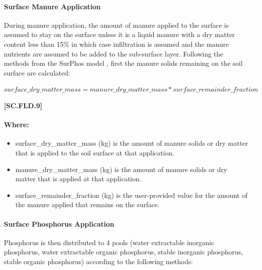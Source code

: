 \paragraph{Surface Manure Application}
\vspace{-0.25cm}

During manure application, the amount of manure applied to the surface is assumed to stay on the surface unless it is a liquid manure with a dry matter content less than 15\% in which case infiltration is assumed and the manure nutrients are assumed to be added to the sub-surface layer. Following the methods from the SurPhos model \parencite{vadas2007}, first the manure solids remaining on the soil surface are calculated:
            \vspace{0.5cm} 
    
    \begin{center}
        \(surface\_dry\_matter\_mass=manure\_dry\_matter\_mass * surface\_remainder\_fraction\)
    \end{center}
        \vspace{0.5cm} 
    
            {\raggedleft \textbf{[SC.FLD.9]}\par}
            \vspace{0.5cm} 
            
\paragraph{Where:}
\begin{itemize}
    \item surface\_dry\_matter\_mass (kg) is the amount of manure solids or dry matter that is applied to the soil surface at that application. 
    \item manure\_dry\_matter\_mass (kg) is the amount of manure solids or dry matter that is applied at that application. 
    \item surface\_remainder\_fraction (kg) is the user-provided value for the amount of the manure applied that remains on the surface.
\end{itemize}


\paragraph{Surface Phosphorus Application}
\vspace{-0.25cm}

Phosphorus is then distributed to 4 pools (water extractable inorganic phosphorus, water extractable organic phosphorus, stable inorganic phosphorus, stable organic phosphorus) according to the following methods:
\vspace{0.2cm}

